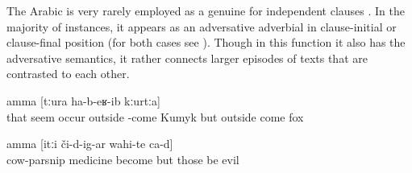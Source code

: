 The Arabic    is very rarely employed as a genuine  for independent clauses . In the majority of instances, it appears as an adversative adverbial in clause-initial  or clause-final position  (for both cases see ). Though in this function it also has the adversative semantics, it rather connects larger episodes of texts that are contrasted to each other.
%
\begin{exe}
	\ex	\label{ex:‎‎‎He thought that the Kumyk man would come out (of the pit), but a fox came out}
		amma	[tːura	ha-b-eʁ-ib kːurtːa]\\
		that	seem	occur	outside -come	Kumyk		but	outside come	fox\\
	\glt	{}

	\ex	\label{ex:‎‎‎There is this medical cow-parsnip, but if these (plants) get on (the skin), it is bad}
	\gll	[birikːʷa=ra	darman-na	d-irχʷ-ar]	amma	[itːi	či-d-ig-ar	wahi-te	ca-d]\\
		cow-parsnip	medicine	become	but	those	be	evil \\
	\glt	{}
\end{exe}

